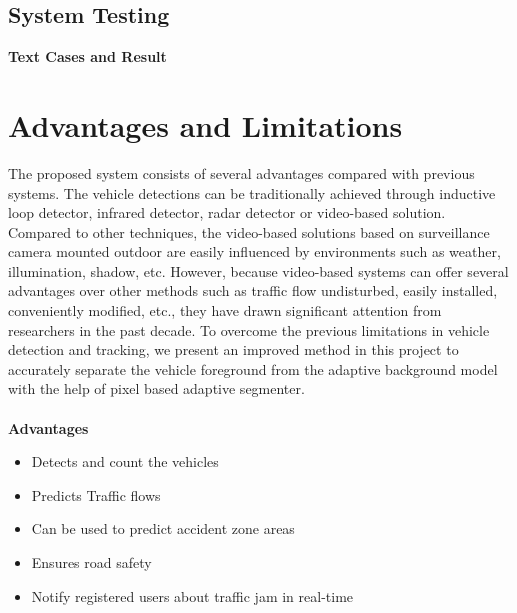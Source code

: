 \subsection{System Testing}
\textbf{Text Cases and Result}\\[0.5 cm]
\begin{table}[ht]
\caption{System test cases and results}
\end{table}
\newpage


\section{Advantages and Limitations}

\par The proposed system consists of several advantages compared with previous systems. The vehicle detections can be traditionally achieved through inductive loop detector, infrared detector, radar detector or video-based solution. Compared to other techniques, the video-based solutions based on surveillance camera mounted outdoor are easily influenced by environments such as weather, illumination, shadow, etc. However, because video-based systems can offer several advantages over other methods such as traffic flow undisturbed, easily installed, conveniently modified, etc., they have drawn significant attention from researchers in the past decade. To overcome the previous limitations in vehicle detection and tracking, we present an improved method in this project to accurately separate the vehicle foreground from the adaptive background model with the help of pixel based adaptive segmenter.
\\
\\
\textbf{Advantages}\\ 
\begin{itemize}
\item Detects and count the vehicles 
\item Predicts Traffic flows 
\item Can be used to predict accident zone areas 
\item Ensures road safety
\item Notify registered users about traffic jam in real-time

\end{itemize}


